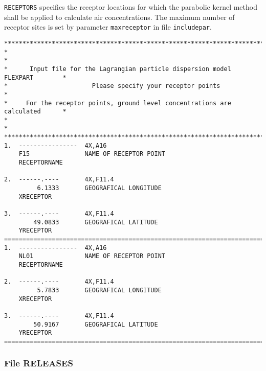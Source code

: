 \documentclass{egu}            %
\begin{document}
\verb|RECEPTORS| specifies the receptor locations for which the parabolic
kernel method shall be applied to calculate air concentrations.  The maximum
number of receptor sites is set by parameter \verb|maxreceptor| in file
\verb|includepar|.
\begin{scriptsize}\begin{verbatim}
********************************************************************************
*                                                                              *
*      Input file for the Lagrangian particle dispersion model FLEXPART        * 
*                       Please specify your receptor points                    * 
*     For the receptor points, ground level concentrations are calculated      * 
*                                                                              *
********************************************************************************
1.  ----------------  4X,A16
    F15               NAME OF RECEPTOR POINT
    RECEPTORNAME

2.  ------.----       4X,F11.4
         6.1333       GEOGRAFICAL LONGITUDE
    XRECEPTOR

3.  ------.----       4X,F11.4
        49.0833       GEOGRAFICAL LATITUDE
    YRECEPTOR
================================================================================
1.  ----------------  4X,A16
    NL01              NAME OF RECEPTOR POINT
    RECEPTORNAME

2.  ------.----       4X,F11.4
         5.7833       GEOGRAFICAL LONGITUDE
    XRECEPTOR

3.  ------.----       4X,F11.4
        50.9167       GEOGRAFICAL LATITUDE
    YRECEPTOR
================================================================================
\end{verbatim}\end{scriptsize}

\newpage

\subsubsection{File RELEASES}
\end{document}
